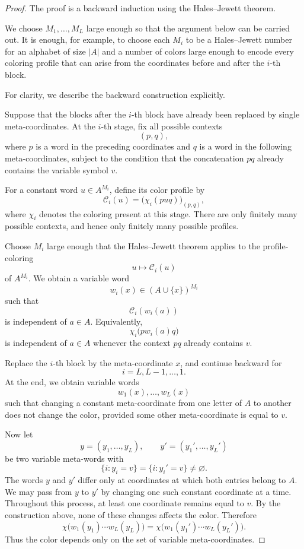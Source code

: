 \documentclass[11pt]{article}
\begin{document}
\begin{proof}
  The proof is a backward induction using the Hales--Jewett theorem.

  We choose \(M_1,\dots,M_L\) large enough so that the argument below
  can be carried out. It is enough, for example, to choose each \(M_i\)
  to be a Hales--Jewett number for an alphabet of size \(|A|\) and a
  number of colors large enough to encode every coloring profile that
  can arise from the coordinates before and after the \(i\)-th block.

  For clarity, we describe the backward construction explicitly.

  Suppose that the blocks after the \(i\)-th block have already been
  replaced by single meta-coordinates. At the \(i\)-th stage, fix all
  possible contexts
  \[
    (p,q),
  \]
  where \(p\) is a word in the preceding coordinates and \(q\) is a word
  in the following meta-coordinates, subject to the condition that the
  concatenation \(pq\) already contains the variable symbol \(v\).

  For a constant word \(u\in A^{M_i}\), define its color profile by
  \[
    \mathcal C_i(u)
    =
    \bigl(
      \chi_i(puq)
    \bigr)_{(p,q)},
  \]
  where \(\chi_i\) denotes the coloring present at this stage. There are
  only finitely many possible contexts, and hence only finitely many
  possible profiles.

  Choose \(M_i\) large enough that the Hales--Jewett theorem applies to
  the profile-coloring
  \[
    u\longmapsto\mathcal C_i(u)
  \]
  of \(A^{M_i}\). We obtain a variable word
  \[
    w_i(x)\in(A\cup\{x\})^{M_i}
  \]
  such that
  \[
    \mathcal C_i(w_i(a))
  \]
  is independent of \(a\in A\). Equivalently,
  \[
    \chi_i\bigl(pw_i(a)q\bigr)
  \]
  is independent of \(a\in A\) whenever the context \(pq\) already
  contains \(v\).

  Replace the \(i\)-th block by the meta-coordinate \(x\), and continue
  backward for
  \[
    i=L,L-1,\dots,1.
  \]
  At the end, we obtain variable words
  \[
    w_1(x),\dots,w_L(x)
  \]
  such that changing a constant meta-coordinate from one letter of \(A\)
  to another does not change the color, provided some other
  meta-coordinate is equal to \(v\).

  Now let
  \[
    y=(y_1,\dots,y_L),
    \qquad
    y'=(y_1',\dots,y_L')
  \]
  be two variable meta-words with
  \[
    \{i:y_i=v\}=\{i:y_i'=v\}\neq\varnothing.
  \]
  The words \(y\) and \(y'\) differ only at coordinates at which both
  entries belong to \(A\). We may pass from \(y\) to \(y'\) by changing
  one such constant coordinate at a time. Throughout this process, at
  least one coordinate remains equal to \(v\). By the construction
  above, none of these changes affects the color. Therefore
  \[
    \chi\bigl(w_1(y_1)\cdots w_L(y_L)\bigr)
    =
    \chi\bigl(w_1(y_1')\cdots w_L(y_L')\bigr).
  \]
  Thus the color depends only on the set of variable meta-coordinates.
\end{proof}
\end{document}
